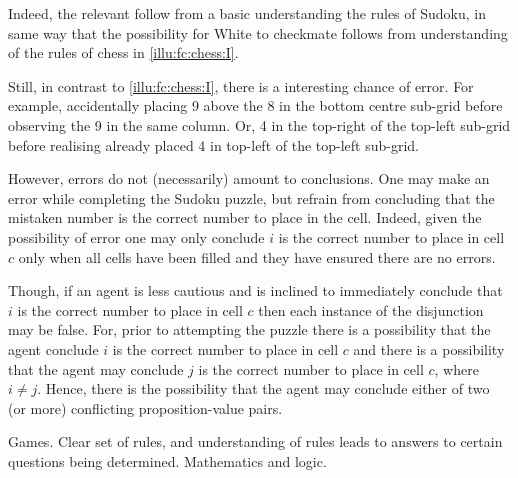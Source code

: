 \begin{note}
  Indeed, the relevant  follow from a basic understanding the rules of Sudoku, in same way that the possibility for White to checkmate follows from understanding of the rules of chess in \autoref{illu:fc:chess:I}.

  Still, in contrast to \autoref{illu:fc:chess:I}, there is a interesting chance of error.
  For example, accidentally placing 9 above the 8 in the bottom centre sub-grid before observing the 9 in the same column.
  Or, 4 in the top-right of the top-left sub-grid before realising already placed 4 in top-left of the top-left sub-grid.

  However, errors do not (necessarily) amount to conclusions.
  One may make an error while completing the Sudoku puzzle, but refrain from concluding that the mistaken number is the correct number to place in the cell.
  Indeed, given the possibility of error one may only conclude \(i\) is the correct number to place in cell \(c\) only when all cells have been filled and they have ensured there are no errors.

  Though, if an agent is less cautious and is inclined to immediately conclude that \(i\) is the correct number to place in cell \(c\) then each instance of the disjunction may be false.
  For, prior to attempting the puzzle there is a possibility that the agent conclude \(i\) is the correct number to place in cell \(c\) and there is a possibility that the agent may conclude \(j\) is the correct number to place in cell \(c\), where \(i \ne j\).
  Hence, there is the possibility that the agent may conclude either of two (or more) conflicting proposition-value pairs.
\end{note}

\begin{note}
  Games.
  Clear set of rules, and understanding of rules leads to answers to certain questions being determined.
  Mathematics and logic.
\end{note}

